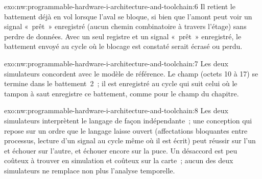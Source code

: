 \begin{solution}{exo:nw:programmable-hardware-i-architecture-and-toolchain:6}
Il retient le battement déjà en vol lorsque l'aval se bloque, si bien que l'amont peut voir un signal «~prêt~» enregistré (aucun chemin combinatoire
à travers l'étage) sans perdre de données. Avec un seul registre et un signal «~prêt~» enregistré, le battement envoyé au cycle où le blocage est
constaté serait écrasé ou perdu.
\end{solution}

\begin{solution}{exo:nw:programmable-hardware-i-architecture-and-toolchain:7}
Les deux simulateurs concordent avec le modèle de référence. Le champ (octets 10 à 17) se termine dans le battement~2~; il est enregistré au cycle qui suit
celui où le tampon à saut enregistre ce battement, comme pour le champ du chapitre.
\end{solution}

\begin{solution}{exo:nw:programmable-hardware-i-architecture-and-toolchain:8}
Les deux simulateurs interprètent le langage de façon indépendante~; une conception qui repose sur un ordre que le langage laisse ouvert (affectations
bloquantes entre processus, lecture d'un signal au cycle même où il est écrit) peut réussir sur l'un et échouer sur l'autre, et échouer encore sur
la puce. Un désaccord est peu coûteux à trouver en simulation et coûteux sur la carte~; aucun des deux simulateurs ne remplace non plus l'analyse temporelle.
\end{solution}


